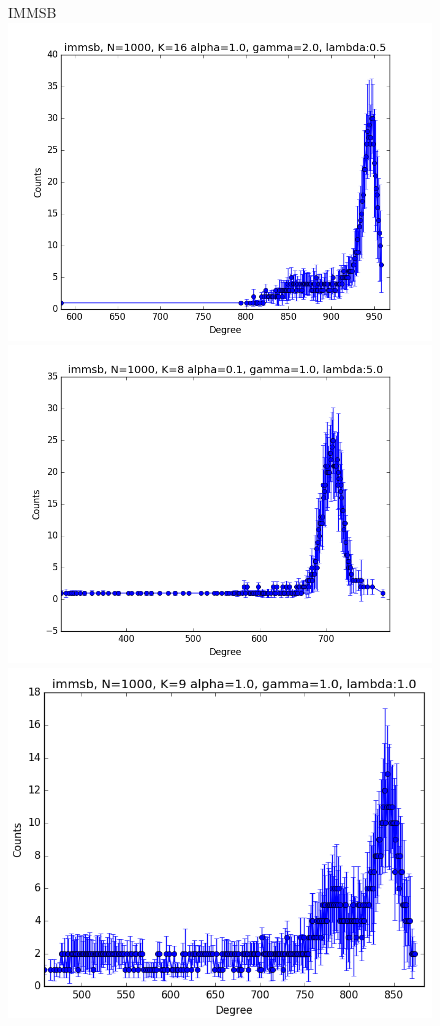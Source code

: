 \begin{figure}[ht]
	\centering IMMSB\\
	\includegraphics[scale=0.27]{img/M_g_peaks/figure_1}
	\endminipage
	\includegraphics[scale=0.27]{img/M_g_power_law/figure_1}
	\endminipage
	\includegraphics[scale=0.27]{img/M_g_regular/figure_1}

\end{figure}
